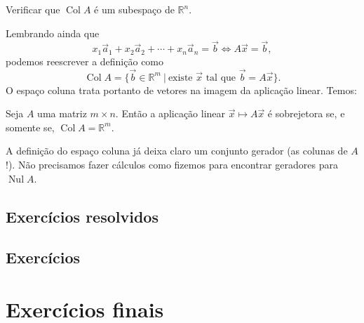 \documentclass[../livro.tex]{subfiles}  %
\begin{document}
\begin{exercise}
	Verificar que $\operatorname{Col} A$ é um subespaço de $\mathbb{R}^n$.
\end{exercise}

Lembrando ainda que
\begin{equation}
x_1 \vec{a}_1 + x_2 \vec{a}_2 + \cdots + x_n \vec{a}_n = \vec{b} \iff A \vec{x} = \vec{b},
\end{equation} podemos reescrever a definição como 
\begin{equation}
\operatorname{Col} A = \{ \vec{b} \in \mathbb{R}^m \ | \ \text{existe } \vec{x} \text{ tal que } \vec{b} = A \vec{x} \}.
\end{equation} O espaço coluna trata portanto de vetores na imagem da aplicação linear. Temos:

\begin{proposition}
	Seja $A$ uma matriz $m\times n$. Então a aplicação linear $\vec{x} \mapsto A \vec{x}$ é sobrejetora se, e somente se, $\operatorname{Col} A = \mathbb{R}^m.$
\end{proposition}

A definição do espaço coluna já deixa claro um conjunto gerador (as colunas de $A$!). Não precisamos fazer cálculos como fizemos para encontrar geradores para $\operatorname{Nul} A$.

\subsection*{Exercícios resolvidos}

\construirExeresol

\subsection*{Exercícios}

\construirExer

\section{Exercícios finais}

\construirExer
\end{document}
